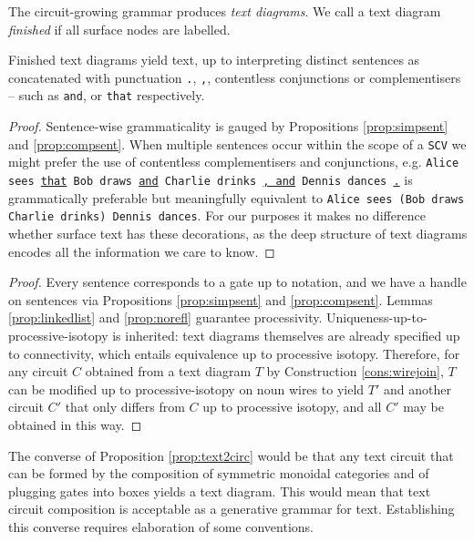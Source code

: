 \begin{defn}\label{defn:finished}
The circuit-growing grammar produces \emph{text diagrams}. We call a text diagram \emph{finished} if all surface nodes are labelled.
\end{defn}

\begin{proposition}
Finished text diagrams yield text, up to interpreting distinct sentences as concatenated with punctuation \texttt{.}, \texttt{,}, contentless conjunctions or complementisers -- such as \texttt{and}, or \texttt{that} respectively.
\begin{proof}
Sentence-wise grammaticality is gauged by Propositions \ref{prop:simpsent} and \ref{prop:compsent}. When multiple sentences occur within the scope of a \texttt{SCV} we might prefer the use of contentless complementisers and conjunctions, e.g. \texttt{Alice sees \underline{that} Bob draws \underline{and} Charlie drinks \underline{, and} Dennis dances \underline{.}} is grammatically preferable but meaningfully equivalent to \texttt{Alice sees (Bob draws Charlie drinks) Dennis dances}. For our purposes it makes no difference whether surface text has these decorations, as the deep structure of text diagrams encodes all the information we care to know.
\end{proof}
\end{proposition}

\begin{proposition}\label{prop:text2circ}
\begin{proof}
Every sentence corresponds to a gate up to notation, and we have a handle on sentences via Propositions \ref{prop:simpsent} and \ref{prop:compsent}. Lemmas \ref{prop:linkedlist} and \ref{prop:norefl} guarantee processivity. Uniqueness-up-to-processive-isotopy is inherited: text diagrams themselves are already specified up to connectivity, which entails equivalence up to processive isotopy. Therefore, for any circuit $C$ obtained from a text diagram $T$ by Construction \ref{cons:wirejoin}, $T$ can be modified up to processive-isotopy on noun wires to yield $T'$ and another circuit $C'$ that only differs from $C$ up to processive isotopy, and all $C'$ may be obtained in this way.
\end{proof}
\end{proposition}

The converse of Proposition \ref{prop:text2circ} would be that any text circuit that can be formed by the composition of symmetric monoidal categories and of plugging gates into boxes yields a text diagram. This would mean that text circuit composition is acceptable as a generative grammar for text. Establishing this converse requires elaboration of some conventions.

